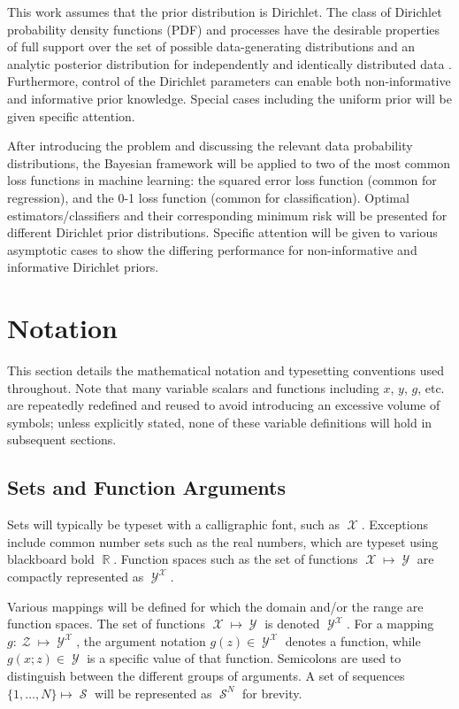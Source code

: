 \documentclass[12pt]{report}
\newcommand{\todolo}[1]{\todo[inline,color=green!50,linecolor=red]{#1}}
\DeclareMathOperator{\Xcal}{\mathcal{X}}
\DeclareMathOperator{\Ycal}{\mathcal{Y}}
\DeclareMathOperator{\Zcal}{\mathcal{Z}}
\DeclareMathOperator{\Scal}{\mathcal{S}}
\DeclareMathOperator{\Rbb}{\mathbb{R}}
\begin{document}
This work assumes that the prior distribution is Dirichlet. The class of Dirichlet probability density functions (PDF) and processes have the desirable properties of full support over the set of possible data-generating distributions and an analytic posterior distribution for independently and identically distributed data \cite{ferguson}. Furthermore, control of the Dirichlet parameters can enable both non-informative and informative prior knowledge. Special cases including the uniform prior will be given specific attention.

After introducing the problem and discussing the relevant data probability distributions, the Bayesian framework will be applied to two of the most common loss functions in machine learning: the squared error loss function (common for regression), and the 0-1 loss function \cite{berger} (common for classification). Optimal estimators/classifiers and their corresponding minimum risk will be presented for different Dirichlet prior distributions. Specific attention will be given to various asymptotic cases to show the differing performance for non-informative and informative Dirichlet priors.




\section{Notation}

This section details the mathematical notation and typesetting conventions used throughout. Note that many variable scalars and functions including $x$, $y$, $g$, etc. are repeatedly redefined and reused to avoid introducing an excessive volume of symbols; unless explicitly stated, none of these variable definitions will hold in subsequent sections.


\subsection*{Sets and Function Arguments}

Sets will typically be typeset with a calligraphic font, such as $\Xcal$. Exceptions include common number sets such as the real numbers, which are typeset using blackboard bold $\Rbb$. Function spaces such as the set of functions $\Xcal \mapsto \Ycal$ are compactly represented as $\Ycal^{\Xcal}$.

\todolo{non-calligraphic for risk, loss, etc?}

Various mappings will be defined for which the domain and/or the range \cite{rudin} are function spaces. The set of functions $\Xcal \mapsto \Ycal$ is denoted $\Ycal^{\Xcal}$. For a mapping $g : \Zcal \mapsto \Ycal^{\Xcal}$, the argument notation $g(z) \in \Ycal^{\Xcal}$ denotes a function, while $g(x;z) \in \Ycal$ is a specific value of that function. Semicolons are used to distinguish between the different groups of arguments. A set of sequences $\{1,\ldots,N\} \mapsto \Scal$ will be represented as $\Scal^N$ for brevity.
\end{document}
